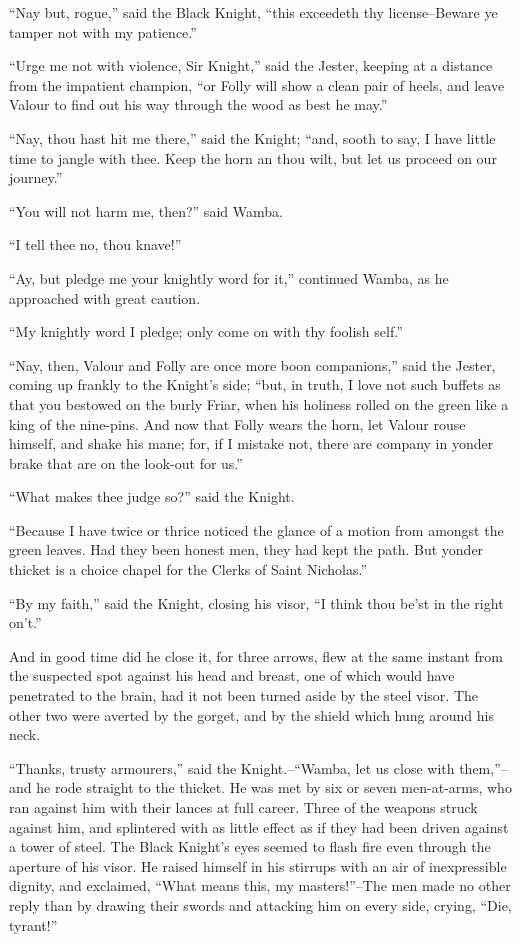 ``Nay but, rogue,'' said the Black Knight, ``this exceedeth thy
license--Beware ye tamper not with my patience.''

``Urge me not with violence, Sir Knight,'' said the Jester, keeping at a
distance from the impatient champion, ``or Folly will show a clean pair
of heels, and leave Valour to find out his way through the wood as best
he may.''

``Nay, thou hast hit me there,'' said the Knight; ``and, sooth to say, I
have little time to jangle with thee. Keep the horn an thou wilt, but
let us proceed on our journey.''

``You will not harm me, then?'' said Wamba.

``I tell thee no, thou knave!''

``Ay, but pledge me your knightly word for it,'' continued Wamba, as he
approached with great caution.

``My knightly word I pledge; only come on with thy foolish self.''

``Nay, then, Valour and Folly are once more boon companions,'' said the
Jester, coming up frankly to the Knight's side; ``but, in truth, I love
not such buffets as that you bestowed on the burly Friar, when his
holiness rolled on the green like a king of the nine-pins. And now that
Folly wears the horn, let Valour rouse himself, and shake his mane; for,
if I mistake not, there are company in yonder brake that are on the
look-out for us.''

``What makes thee judge so?'' said the Knight.

``Because I have twice or thrice noticed the glance of a motion from
amongst the green leaves. Had they been honest men, they had kept the
path. But yonder thicket is a choice chapel for the Clerks of Saint
Nicholas.''

``By my faith,'' said the Knight, closing his visor, ``I think thou
be'st in the right on't.''

And in good time did he close it, for three arrows, flew at the same
instant from the suspected spot against his head and breast, one of
which would have penetrated to the brain, had it not been turned aside
by the steel visor. The other two were averted by the gorget, and by the
shield which hung around his neck.

``Thanks, trusty armourers,'' said the Knight.--``Wamba, let us close
with them,''--and he rode straight to the thicket. He was met by six or
seven men-at-arms, who ran against him with their lances at full career.
Three of the weapons struck against him, and splintered with as little
effect as if they had been driven against a tower of steel. The Black
Knight's eyes seemed to flash fire even through the aperture of his
visor. He raised himself in his stirrups with an air of inexpressible
dignity, and exclaimed, ``What means this, my masters!''--The men made
no other reply than by drawing their swords and attacking him on every
side, crying, ``Die, tyrant!''

